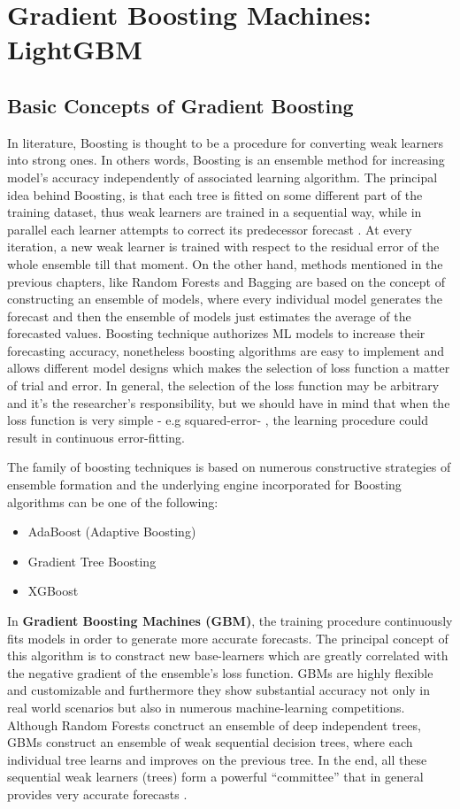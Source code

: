 \chapter{Gradient Boosting Machines: LightGBM}
\section{Basic Concepts of Gradient Boosting}
In literature, Boosting is thought to be a procedure for converting weak learners into strong ones. In
others words, Boosting is an ensemble method for increasing model's accuracy independently of associated learning algorithm. The principal idea behind Boosting, is that each tree is fitted on some different part of the training dataset, thus weak learners are trained in a sequential way, while in parallel each learner attempts to correct its predecessor forecast \cite{ligentle}. At every iteration, a new weak learner is trained with respect to the residual error of the whole ensemble till that moment. On the other hand, methods mentioned in the previous chapters, like Random Forests and Bagging are based on the concept of constructing an ensemble of models, where every individual model generates the forecast and then the ensemble of models just estimates the average of the forecasted values. Boosting technique authorizes ML models to increase their forecasting accuracy, nonetheless boosting algorithms are easy to implement and allows different model designs which makes the selection of loss function a matter of trial and error. In general, the selection of the loss function may be arbitrary and it's the researcher's responsibility, but we should have in mind that when the loss function is very simple - e.g squared-error- , the learning procedure could result in continuous error-fitting. 
\par The family of boosting techniques is based on numerous constructive strategies of ensemble formation and the underlying engine incorporated for Boosting algorithms can be one of the following:
\begin{itemize}
    \item AdaBoost (Adaptive Boosting)
    \item Gradient Tree Boosting
    \item XGBoost
\end{itemize}
In \textbf{Gradient Boosting Machines (GBM)}, the training procedure continuously fits models in order to generate more accurate forecasts. The principal concept of this algorithm is to constract new base-learners which are greatly correlated with the negative gradient of the ensemble's loss function. GBMs are highly flexible and customizable and furthermore they show substantial accuracy not only in real world scenarios but also in numerous machine-learning competitions. Although Random Forests conctruct an ensemble of deep independent trees, GBMs construct an ensemble of weak sequential decision trees, where each individual tree learns and improves on the previous tree. In the end, all these sequential weak learners (trees) form a powerful “committee” that in general provides very accurate forecasts \cite{mei2018short}.
